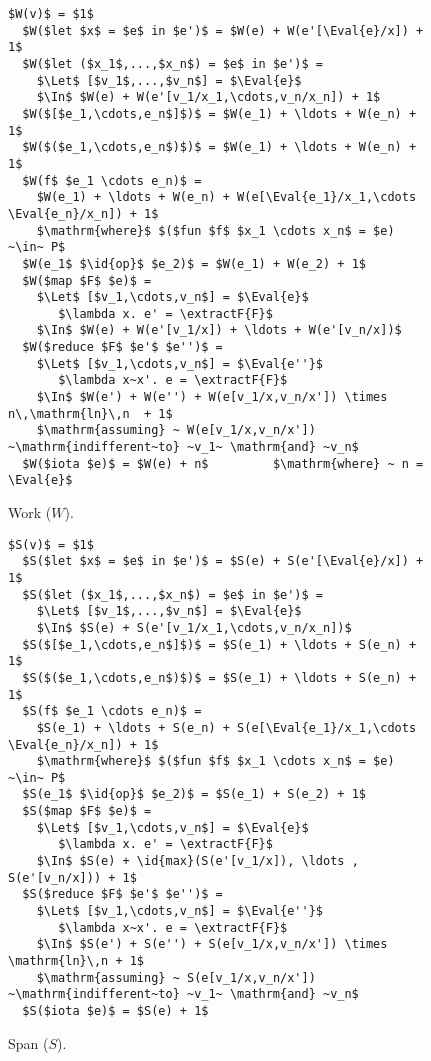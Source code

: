 \documentclass[11pt]{book}
\begin{document}
\begin{figure}
\begin{lstlisting}[mathescape=true]
  $W(v)$ = $1$
  $W($let $x$ = $e$ in $e')$ = $W(e) + W(e'[\Eval{e}/x]) + 1$
  $W($let ($x_1$,...,$x_n$) = $e$ in $e')$ =
    $\Let$ [$v_1$,...,$v_n$] = $\Eval{e}$
    $\In$ $W(e) + W(e'[v_1/x_1,\cdots,v_n/x_n]) + 1$
  $W($[$e_1,\cdots,e_n$]$)$ = $W(e_1) + \ldots + W(e_n) + 1$
  $W($($e_1,\cdots,e_n$)$)$ = $W(e_1) + \ldots + W(e_n) + 1$
  $W(f$ $e_1 \cdots e_n)$ =
    $W(e_1) + \ldots + W(e_n) + W(e[\Eval{e_1}/x_1,\cdots \Eval{e_n}/x_n]) + 1$
    $\mathrm{where}$ $($fun $f$ $x_1 \cdots x_n$ = $e) ~\in~ P$
  $W(e_1$ $\id{op}$ $e_2)$ = $W(e_1) + W(e_2) + 1$
  $W($map $F$ $e)$ =
    $\Let$ [$v_1,\cdots,v_n$] = $\Eval{e}$
       $\lambda x. e' = \extractF{F}$
    $\In$ $W(e) + W(e'[v_1/x]) + \ldots + W(e'[v_n/x])$
  $W($reduce $F$ $e'$ $e'')$ =
    $\Let$ [$v_1,\cdots,v_n$] = $\Eval{e''}$
       $\lambda x~x'. e = \extractF{F}$
    $\In$ $W(e') + W(e'') + W(e[v_1/x,v_n/x']) \times n\,\mathrm{ln}\,n  + 1$
    $\mathrm{assuming} ~ W(e[v_1/x,v_n/x']) ~\mathrm{indifferent~to} ~v_1~ \mathrm{and} ~v_n$
  $W($iota $e)$ = $W(e) + n$         $\mathrm{where} ~ n = \Eval{e}$
\end{lstlisting}

\caption{Work ($W$).}
\label{fig:work}
\end{figure}

\begin{figure}
\begin{lstlisting}[mathescape=true]
  $S(v)$ = $1$
  $S($let $x$ = $e$ in $e')$ = $S(e) + S(e'[\Eval{e}/x]) + 1$
  $S($let ($x_1$,...,$x_n$) = $e$ in $e')$ =
    $\Let$ [$v_1$,...,$v_n$] = $\Eval{e}$
    $\In$ $S(e) + S(e'[v_1/x_1,\cdots,v_n/x_n])$
  $S($[$e_1,\cdots,e_n$]$)$ = $S(e_1) + \ldots + S(e_n) + 1$
  $S($($e_1,\cdots,e_n$)$)$ = $S(e_1) + \ldots + S(e_n) + 1$
  $S(f$ $e_1 \cdots e_n)$ =
    $S(e_1) + \ldots + S(e_n) + S(e[\Eval{e_1}/x_1,\cdots \Eval{e_n}/x_n]) + 1$
    $\mathrm{where}$ $($fun $f$ $x_1 \cdots x_n$ = $e) ~\in~ P$
  $S(e_1$ $\id{op}$ $e_2)$ = $S(e_1) + S(e_2) + 1$
  $S($map $F$ $e)$ =
    $\Let$ [$v_1,\cdots,v_n$] = $\Eval{e}$
       $\lambda x. e' = \extractF{F}$
    $\In$ $S(e) + \id{max}(S(e'[v_1/x]), \ldots , S(e'[v_n/x])) + 1$
  $S($reduce $F$ $e'$ $e'')$ =
    $\Let$ [$v_1,\cdots,v_n$] = $\Eval{e''}$
       $\lambda x~x'. e = \extractF{F}$
    $\In$ $S(e') + S(e'') + S(e[v_1/x,v_n/x']) \times \mathrm{ln}\,n + 1$
    $\mathrm{assuming} ~ S(e[v_1/x,v_n/x']) ~\mathrm{indifferent~to} ~v_1~ \mathrm{and} ~v_n$
  $S($iota $e)$ = $S(e) + 1$
\end{lstlisting}

\caption{Span ($S$).}
\label{fig:span}
\end{figure}
\end{document}
